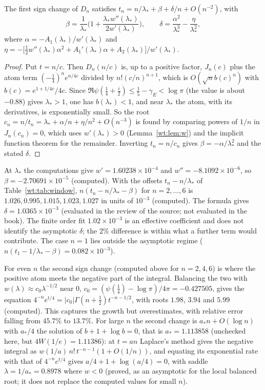 \begin{proposition}\label{wt:prop:expansion}
The first sign change of $D_n$ satisfies $t_n=n/\lambda_*+\beta+\delta/n+O(n^{-2})$, with
\[
\beta=\frac1{\lambda_*}\Big(1+\frac{\lambda_*w''(\lambda_*)}{2w'(\lambda_*)}\Big),\qquad \delta=\frac{\alpha^2}{\lambda_*^3}-\frac{\eta}{\lambda_*^2},
\]
where $\alpha=-A_1(\lambda_*)/w'(\lambda_*)$ and $\eta=-\big[\tfrac12w''(\lambda_*)\alpha^2+A_1'(\lambda_*)\alpha+A_2(\lambda_*)\big]/w'(\lambda_*)$.
\end{proposition}

\begin{proof}
Put $t=n/c$. Then $D_n(n/c)$ is, up to a positive factor, $J_n(c)$ plus the atom term $(-\frac14)^ne^{n/4c}$ divided by $n!(c/n)^{n+1}$, which is $O(\sqrt nb(c)^n)$ with $b(c)=e^{1+1/4c}/4c$. Since $\Re\psi(\frac14+\frac i2)\le\frac15-\gamma_E<\log\pi$ (the value is about $-0.88$) gives $\lambda_*>1$, one has $b(\lambda_*)<1$, and near $\lambda_*$ the atom, with its derivatives, is exponentially small. So the root $c_n=n/t_n=\lambda_*+\alpha/n+\eta/n^2+O(n^{-3})$ is found by comparing powers of $1/n$ in $J_n(c_n)=0$, which uses $w'(\lambda_*)>0$ (Lemma~\ref{wt:lem:w}) and the implicit function theorem for the remainder. Inverting $t_n=n/c_n$ gives $\beta=-\alpha/\lambda_*^2$ and the stated $\delta$.
\end{proof}

At $\lambda_*$ the computations give $w'=1.60238\times10^{-4}$ and $w''=-8.1092\times10^{-6}$, so $\beta=-2.70691\times10^{-5}$ (computed). With the offsets $t_n-n/\lambda_*$ of Table~\ref{wt:tab:window}, $n(t_n-n/\lambda_*-\beta)$ for $n=2,\dots,6$ is $1.026,0.995,1.015,1.023,1.027$ in units of $10^{-3}$ (computed). The formula gives $\delta=1.0365\times10^{-3}$ (evaluated in the review of the source; not evaluated in the book). The finite order fit $1.02\times10^{-3}$ is an effective coefficient and does not identify the asymptotic $\delta$; the 2\% difference is within what a further term would contribute. The case $n=1$ lies outside the asymptotic regime ($n(t_1-1/\lambda_*-\beta)=0.082\times10^{-3}$).

For even $n$ the second sign change (computed above for $n=2,4,6$) is where the positive atom meets the negative part of the integral. Balancing the two with $w(\lambda)\approx c_0\lambda^{-1/2}$ near $0$, $c_0=(\psi(\frac14)-\log\pi)/4\pi=-0.427505$, gives the equation $4^{-n}e^{t/4}=|c_0|\Gamma(n+\frac12)t^{-n-1/2}$, with roots $1.98$, $3.94$ and $5.99$ (computed). This captures the growth but overestimates, with relative error falling from $45.7\%$ to $13.7\%$. For large $n$ the second change is $a_*n+O(\log n)$ with $a_*/4$ the solution of $b+1+\log b=0$, that is $a_*=1.113858$ (unchecked here, but $4W(1/e)=1.11386$): at $t=an$ Laplace's method gives the negative integral as $w(1/a)\,n!\,t^{-n-1}(1+O(1/n))$, and equating its exponential rate with that of $4^{-n}e^{t/4}$ gives $a/4+1+\log(a/4)=0$, with saddle $\lambda=1/a_*=0.8978$ where $w<0$ (proved, as an asymptotic for the local balanced root; it does not replace the computed values for small $n$).

